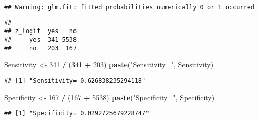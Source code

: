 \documentclass[]{article}
\newenvironment{Shaded}{\begin{snugshade}}{\end{snugshade}}
\newcommand{\KeywordTok}[1]{\textcolor[rgb]{0.13,0.29,0.53}{\textbf{#1}}}
\newcommand{\DataTypeTok}[1]{\textcolor[rgb]{0.13,0.29,0.53}{#1}}
\newcommand{\DecValTok}[1]{\textcolor[rgb]{0.00,0.00,0.81}{#1}}
\newcommand{\FloatTok}[1]{\textcolor[rgb]{0.00,0.00,0.81}{#1}}
\newcommand{\StringTok}[1]{\textcolor[rgb]{0.31,0.60,0.02}{#1}}
\newcommand{\OtherTok}[1]{\textcolor[rgb]{0.56,0.35,0.01}{#1}}
\newcommand{\OperatorTok}[1]{\textcolor[rgb]{0.81,0.36,0.00}{\textbf{#1}}}
\newcommand{\NormalTok}[1]{#1}
\begin{document}
\begin{verbatim}
## Warning: glm.fit: fitted probabilities numerically 0 or 1 occurred
\end{verbatim}

\begin{Shaded}
\end{Shaded}

\begin{verbatim}
##        
## z_logit  yes   no
##     yes  341 5538
##     no   203  167
\end{verbatim}

\begin{Shaded}
\begin{Highlighting}[]
\NormalTok{Sensitivity <-}\StringTok{ }\DecValTok{341} \OperatorTok{/}\StringTok{ }\NormalTok{(}\DecValTok{341} \OperatorTok{+}\StringTok{ }\DecValTok{203}\NormalTok{)}
\KeywordTok{paste}\NormalTok{(}\StringTok{"Sensitivity="}\NormalTok{, Sensitivity)}
\end{Highlighting}
\end{Shaded}

\begin{verbatim}
## [1] "Sensitivity= 0.626838235294118"
\end{verbatim}

\begin{Shaded}
\begin{Highlighting}[]
\NormalTok{Specificity <-}\StringTok{ }\DecValTok{167} \OperatorTok{/}\StringTok{ }\NormalTok{(}\DecValTok{167} \OperatorTok{+}\StringTok{ }\DecValTok{5538}\NormalTok{)}
\KeywordTok{paste}\NormalTok{(}\StringTok{"Specificity="}\NormalTok{, Specificity)}
\end{Highlighting}
\end{Shaded}

\begin{verbatim}
## [1] "Specificity= 0.0292725679228747"
\end{verbatim}
\end{document}
